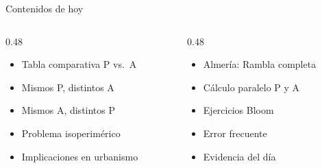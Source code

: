 \documentclass[aspectratio=169, 10pt, spanish]{beamer}
\begin{document}
\begin{frame}[plain]
  \titlepage
\end{frame}

\begin{frame}{Contenidos de hoy}
  \begin{columns}[t]
    \begin{column}{0.48\textwidth}
      \begin{itemize}
        \item Tabla comparativa P vs.\ A
        \item Mismos P, distintos A
        \item Mismos A, distintos P
        \item Problema isoperimérico
        \item Implicaciones en urbanismo
      \end{itemize}
    \end{column}
    \begin{column}{0.48\textwidth}
      \begin{itemize}
        \item Almería: Rambla completa
        \item Cálculo paralelo P y A
        \item Ejercicios Bloom
        \item Error frecuente
        \item Evidencia del día
      \end{itemize}
    \end{column}
  \end{columns}
  \vspace{0.4cm}
  \begin{notabox}
    \quad
    \quad
  \end{notabox}
\end{frame}

\end{document}
